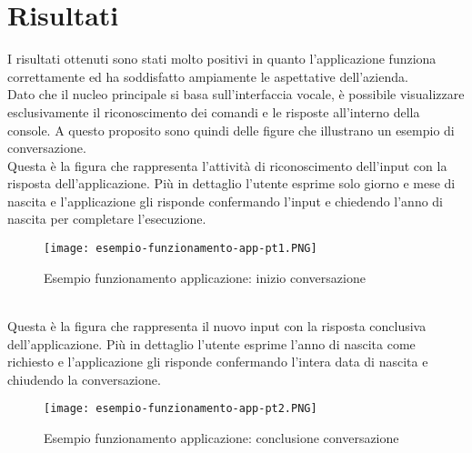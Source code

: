 \section{Risultati}
I risultati ottenuti sono stati molto positivi in quanto l'applicazione funziona correttamente ed ha soddisfatto ampiamente le aspettative dell'azienda. \\
Dato che il nucleo principale si basa sull'interfaccia vocale, è possibile visualizzare esclusivamente il riconoscimento dei comandi e le risposte all'interno della console. A questo proposito sono quindi delle figure che illustrano un esempio di conversazione. \\
Questa è la figura che rappresenta l'attività di riconoscimento dell'input con la risposta dell'applicazione. Più in dettaglio l'utente esprime solo giorno e mese di nascita e l'applicazione gli risponde confermando l'input e chiedendo l'anno di nascita per completare l'esecuzione. \\
\begin{figure}[htbp]
	\begin{center}
		\texttt{[image: esempio-funzionamento-app-pt1.PNG]}
		\caption{Esempio funzionamento applicazione: inizio conversazione}
	\end{center}
\end{figure}
\\
Questa è la figura che rappresenta il nuovo input con la risposta conclusiva dell'applicazione. Più in dettaglio l'utente esprime l'anno di nascita come richiesto e l'applicazione gli risponde confermando l'intera data di nascita e chiudendo la conversazione. \\
\begin{figure}[htbp]
	\begin{center}
		\texttt{[image: esempio-funzionamento-app-pt2.PNG]}
		\caption{Esempio funzionamento applicazione: conclusione conversazione}
	\end{center}
\end{figure}

